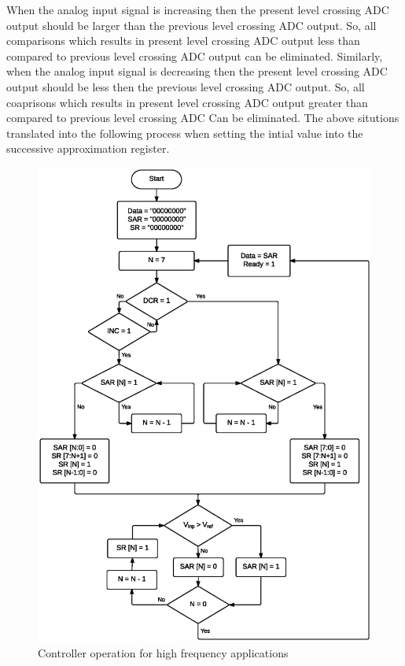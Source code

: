 \par
\hspace{0.6cm} When the analog input signal is increasing then the present level crossing ADC output should be larger than the previous level crossing ADC output. So, all comparisons which results in present level crossing ADC output less than compared to previous level crossing ADC output can be eliminated. Similarly, when the analog input signal is decreasing then the present level crossing ADC output should be less then the previous level crossing ADC output. So, all coaprisons which results in present level crossing ADC output greater than compared to previous level crossing ADC Can be eliminated. The above situtions translated into the following process when setting the intial value into the successive approximation register.

\begin{figure}[H]
	\begin{center}
		\includegraphics[width=10.1 cm, angle=360]{./Figures/HFA.ps}
		\caption{Controller operation for high frequency applications}
		\label{fig:HFA}
	\end{center}
\end{figure}

